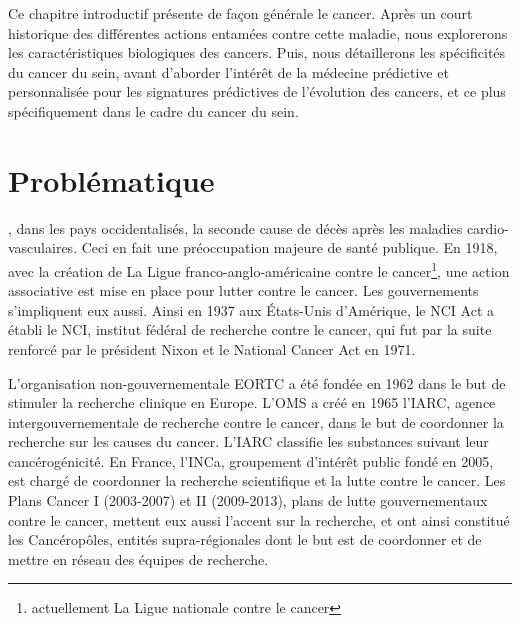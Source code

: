 \singlespacing

		\begin{center}
				\begin{tcolorbox}[colback=red!5!white,colframe=red!45!black,arc=0mm]

					\sffamily
						Ce chapitre introductif présente de façon générale le cancer.
						Après un court historique des différentes actions entamées contre cette maladie, nous explorerons les caractéristiques biologiques des cancers.
						Puis, nous détaillerons les spécificités du cancer du sein, avant d'aborder l'intérêt de la médecine prédictive et personnalisée pour les signatures prédictives de l'évolution des cancers, et ce plus spécifiquement dans le cadre du cancer du sein.
					\end{tcolorbox}
					\vspace{5ex}
					\minitoc
		\end{center}
		\newpage

	\doublespacing

	\section{\textcolor{red!45!black}{Problématique}}\label{sec:Problématique}
		, dans les pays occidentalisés, la seconde cause de décès après les maladies cardio-vasculaires.
		Ceci en fait une préoccupation majeure de santé publique.
		En 1918, avec la création de La Ligue franco-anglo-américaine contre le cancer\footnote{actuellement La Ligue nationale contre le cancer}, une action associative est mise en place pour lutter contre le cancer.
		Les gouvernements s'impliquent eux aussi.
		Ainsi en 1937 aux États-Unis d'Amérique, le \ac{NCI} Act\citep{NCA1937} a établi le \ac{NCI}, institut fédéral de recherche contre le cancer, qui fut par la suite renforcé par le président Nixon et le National Cancer Act en 1971.

		L'organisation non-gouvernementale \ac{EORTC} a été fondée en 1962 dans le but de stimuler la recherche clinique en Europe.
		L'\ac{OMS} a créé en 1965 l'\ac{IARC}, agence intergouvernementale de recherche contre le cancer, dans le but de coordonner la recherche sur les causes du cancer.
		L'\ac{IARC} classifie les substances suivant leur cancérogénicité.
		En France, l'\ac{INCa}, groupement d'intérêt public fondé en 2005, est chargé de coordonner la recherche scientifique et la lutte contre le cancer.
		Les Plans Cancer I (2003-2007) et II (2009-2013), plans de lutte gouvernementaux contre le cancer, mettent eux aussi l'accent sur la recherche, et ont ainsi constitué les Cancéropôles, entités supra-régionales dont le but est de coordonner et de mettre en réseau des équipes de recherche.
		
